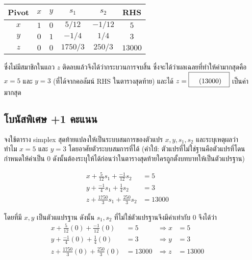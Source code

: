 \begin{solution}
\begin{multicols}{2}
    \begin{tabular}{|c|cccc|c|}
        \hline
        \textbf{Pivot} & $x$ & $y$ &  $s_1$ & $s_2$ &  \textbf{RHS}  \\
        \hline
        $x$ & $1$ & $0$  & $5/12$ & $-1/12$ & $5$ \\
        $y$ & $0$ & $1$  & $-1/4$ & $1/4$ & $3$ \\
        \hline
        $z$   & $0$ & $0$  & $1750/3$ & $250/3$ & $13000$ \\
        \hline
    \end{tabular}
\end{multicols}

ซึ่งไม่มีสมาชิกในแถว $z$ ติดลบแล้วจึงได้ว่ากระบวนการจบสิ้น ซึ่งจะได้ว่าผลเฉลยที่ทำให้ค่ามากสุดคือ $x = 5$ และ $y=3$ (ที่ได้จากคอลัมน์ RHS ในตารางสุดท้าย) และได้ $z = \blank[13000]{1.5cm}$ เป็นค่ามากสุด

\subsection*{โบนัสพิเศษ +1 คะแนน}
จงใช้ตาราง simplex สุดท้ายแปลงให้เป็นระบบสมการของตัวแปร $x, y, s_1, s_2$ และระบุเหตุผลว่าทำไม $x = 5$ และ $y=3$ โดยอาศัยตัวระบบสมการที่ได้ (คำใบ้: ตัวแปรที่ไม่ใช่ฐานคือตัวแปรที่โดนกำหนดให้ค่าเป็น 0 ดังนั้นต้องระบุให้ได้ก่อนว่าในตารางสุดท้ายใครถูกตั้งบทบาทให้เป็นตัวแปรฐาน)

\begin{align*}
    x + \frac{5}{12}s_1 + \frac{-1}{12}s_2 &= 5\\
    y + \frac{-1}{4}s_1 + \frac{1}{4}s_2 &= 3\\
    z + \frac{1750}{3}s_1 + \frac{250}{3}s_2 &= 13000
\end{align*}

โดยที่มี $x,y$ เป็นตัวแแปรฐาน ดังนั้น $s_1,s_2$ ที่ไม่ใช่ตัวแปรฐานจึงมีค่าเท่ากับ $0$ จึงได้ว่า
\begin{align*}
    x + \frac{5}{12}(0) + \frac{-1}{12}(0) &= 5 &\Rightarrow x &= 5\\
    y + \frac{-1}{4}(0) + \frac{1}{4}(0) &= 3 &\Rightarrow y &= 3\\
    z + \frac{1750}{3}(0) + \frac{250}{3}(0) &= 13000&\Rightarrow z &= 13000
\end{align*}
\end{solution}

\newpage
